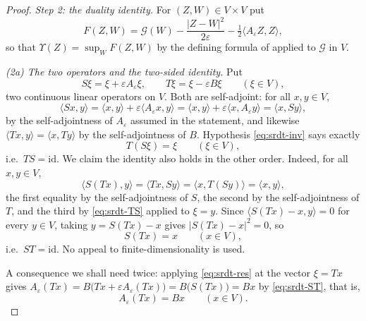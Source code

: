 \begin{proof}
\emph{Step 2: the duality identity.}
For $(Z,W)\in V\times V$ put
\[
  F(Z,W)=\mathcal G(W)-\frac{|Z-W|^2}{2\varepsilon}
    -\tfrac12\langle A_\varepsilon Z,Z\rangle ,
\]
so that $\Upsilon(Z)=\sup_WF(Z,W)$ by the defining formula of
 applied to $\mathcal G$ in $V$.

\emph{(2a) The two operators and the two-sided identity.}
Put
\[
  S\xi=\xi+\varepsilon A_\varepsilon\xi,
  \qquad
  T\xi=\xi-\varepsilon B\xi\qquad(\xi\in V),
\]
two continuous linear operators on $V$. Both are self-adjoint: for all
$x,y\in V$,
\[
  \langle Sx,y\rangle=\langle x,y\rangle
    +\varepsilon\langle A_\varepsilon x,y\rangle
   =\langle x,y\rangle+\varepsilon\langle x,A_\varepsilon y\rangle
   =\langle x,Sy\rangle,
\]
by the self-adjointness of $A_\varepsilon$ assumed in the statement, and
likewise $\langle Tx,y\rangle=\langle x,Ty\rangle$ by the self-adjointness of
$B$. Hypothesis \eqref{eq:srdt-inv} says exactly
\begin{equation}\label{eq:srdt-TS}
  T(S\xi)=\xi\qquad(\xi\in V),
\end{equation}
i.e.\ $TS=\mathrm{id}$. We claim the identity also holds in the other order.
Indeed, for all $x,y\in V$,
\[
  \langle S(Tx),y\rangle
   =\langle Tx,Sy\rangle
   =\langle x,T(Sy)\rangle
   =\langle x,y\rangle,
\]
the first equality by the self-adjointness of $S$, the second by the
self-adjointness of $T$, and the third by \eqref{eq:srdt-TS} applied to
$\xi=y$. Since $\langle S(Tx)-x,y\rangle=0$ for every $y\in V$, taking
$y=S(Tx)-x$ gives $|S(Tx)-x|^2=0$, so
\begin{equation}\label{eq:srdt-ST}
  S(Tx)=x\qquad(x\in V),
\end{equation}
i.e.\ $ST=\mathrm{id}$. No appeal to finite-dimensionality is used.

A consequence we shall need twice: applying \eqref{eq:srdt-res} at the vector
$\xi=Tx$ gives $A_\varepsilon(Tx)=B\bigl(Tx+\varepsilon A_\varepsilon(Tx)\bigr)
=B\bigl(S(Tx)\bigr)=Bx$ by \eqref{eq:srdt-ST}, that is,
\begin{equation}\label{eq:srdt-AT}
  A_\varepsilon(Tx)=Bx\qquad(x\in V).
\end{equation}


\end{proof}
